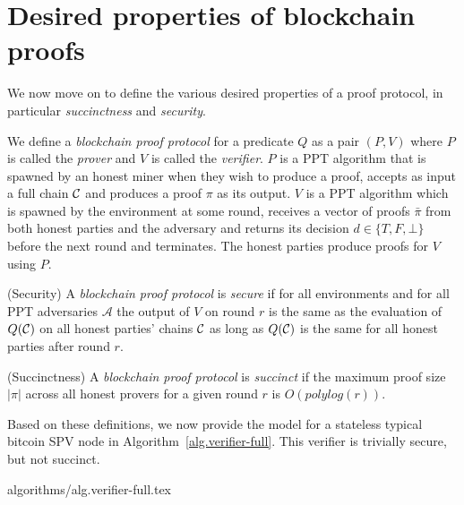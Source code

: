 \section{Desired properties of blockchain proofs}

We now move on to define the various desired properties of a proof protocol, in
particular \textit{succinctness} and \textit{security}.

We define a \textit{blockchain proof protocol} for a predicate $Q$ as a pair
$(P, V)$ where $P$ is called the \textit{prover} and $V$ is called the
\textit{verifier}. $P$ is a PPT algorithm that is spawned by an honest miner
when they wish to produce a proof, accepts as input a full chain $\mathcal{C}$ and
produces a proof $\pi$ as its output. $V$ is a PPT algorithm which is spawned
by the environment at some round, receives a vector of proofs $\bar{\pi}$ from
both honest parties and the adversary and returns its decision $d \in \{T, F,
\bot\}$ before the next round and terminates. The honest parties produce proofs
for $V$ using $P$.

\begin{definition}{(Security)}
A \textit{blockchain proof protocol} is \textit{secure} if for all environments
and for all PPT adversaries $\mathcal{A}$ the output of $V$ on round $r$ is the
same as the evaluation of $Q(\mathcal{C})$ on all honest parties' chains $\mathcal{C}$ as
long as $Q(\mathcal{C})$ is the same for all honest parties after round $r$.
\end{definition}

\begin{definition}{(Succinctness)}
A \textit{blockchain proof protocol} is \textit{succinct} if the maximum proof
size $|\pi|$ across all honest provers for a given round $r$ is
$O(polylog(r))$.
\end{definition}

Based on these definitions, we now provide the model for a stateless typical
bitcoin SPV node in Algorithm~\ref{alg.verifier-full}. This verifier is
trivially secure, but not succinct.

{algorithms/alg.verifier-full.tex}

